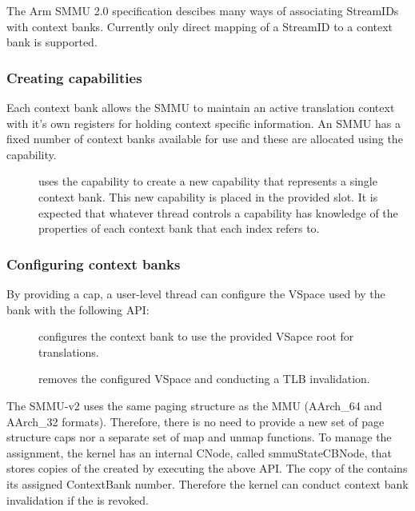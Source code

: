 The Arm SMMU 2.0 specification descibes many ways of associating StreamIDs with
context banks. Currently only direct mapping of a StreamID to a context bank is
supported.

\subsubsection{Creating  capabilities}
\label{sec:smmuv2-creating-sel4-arm-cb-capabilities}

Each context bank allows the SMMU to maintain an active translation context with
it's own registers for holding context specific information. An SMMU has a fixed
number of context banks available for use and these are allocated using the
 capability.

\begin{description}

\item[] uses the
     capability to create a new 
    capability that represents a single context bank.  This new capability is
    placed in the provided slot.  It is expected that whatever thread controls a
     capability has knowledge of the properties of each
    context bank that each index refers to.
\end{description}


\subsubsection{Configuring context banks}
\label{sec:smmuv2-configuring-context-banks}

By providing a  cap, a user-level thread can configure the
VSpace used by the bank with the following API:

\begin{description}
    \item[] configures
        the context bank to use the provided VSapce root for translations.
    \item[] removes
        the configured VSpace and conducting a TLB invalidation.
\end{description}

The SMMU-v2 uses the same paging structure as the MMU (AArch\_64 and AArch\_32
formats). Therefore, there is no need to provide a new set of page structure caps
nor a separate set of map and unmap functions. To manage the assignment, the
kernel has an internal CNode, called smmuStateCBNode, that stores copies of the
 created by executing the above API. The copy of the
 contains its assigned ContextBank number. Therefore the kernel
can conduct context bank invalidation if the  is revoked.


